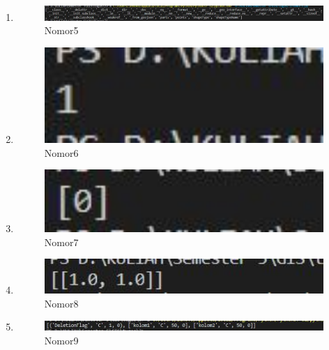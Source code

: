 \begin{enumerate}
			\item 
				
				\begin{figure}[H]
					\includegraphics[width=12cm]{figures/1174043/TUGAS3/5.jpg}
					\centering
					\caption{Nomor5}
				\end{figure}
			
			\item 
				
				\begin{figure}[H]
					\includegraphics[width=12cm]{figures/1174043/TUGAS3/6.jpg}
					\centering
					\caption{Nomor6}
				\end{figure}
			
			\item 
				
				\begin{figure}[H]
					\includegraphics[width=12cm]{figures/1174043/TUGAS3/7.jpg}
					\centering
					\caption{Nomor7}
				\end{figure}
			
			\item 
				
				\begin{figure}[H]
					\includegraphics[width=12cm]{figures/1174043/TUGAS3/8.jpg}
					\centering
					\caption{Nomor8}
				\end{figure}
			
			\item 
				
				\begin{figure}[H]
					\includegraphics[width=12cm]{figures/1174043/TUGAS3/9.jpg}
					\centering
					\caption{Nomor9}
				\end{figure}
			

\end{enumerate}
